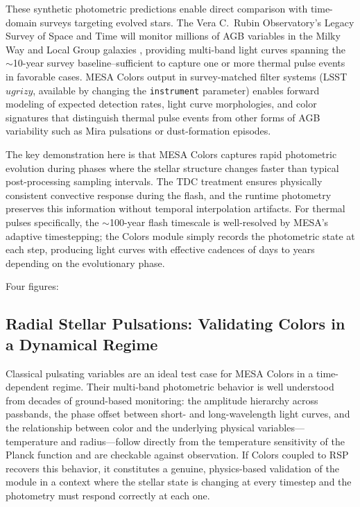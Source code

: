 \documentclass[linenumbers,apj,twocolumn, floatfix]{aastex701} \usepackage{amsmath} \usepackage{longtable} \usepackage{graphicx} \usepackage{ulem} \usepackage{xcolor} \usepackage{lettrine} \usepackage{yfonts} \usepackage{rotating}
\begin{document}
These synthetic photometric predictions enable direct comparison with time-domain surveys targeting evolved stars.
The Vera C.\ Rubin Observatory's Legacy Survey of Space and Time will monitor millions of AGB variables in the Milky Way and Local Group galaxies \citep{LSST}, providing multi-band light curves spanning the $\sim$10-year survey baseline--sufficient to capture one or more thermal pulse events in favorable cases.
MESA Colors output in survey-matched filter systems (LSST $ugrizy$, available by changing the \texttt{instrument} parameter) enables forward modeling of expected detection rates, light curve morphologies, and color signatures that distinguish thermal pulse events from other forms of AGB variability such as Mira pulsations or dust-formation episodes.

The key demonstration here is that MESA Colors captures rapid photometric evolution during phases where the stellar structure changes faster than typical post-processing sampling intervals.
The TDC treatment ensures physically consistent convective response during the flash, and the runtime photometry preserves this information without temporal interpolation artifacts.
For thermal pulses specifically, the $\sim$100-year flash timescale is well-resolved by MESA's adaptive timestepping; the Colors module simply records the photometric state at each step, producing light curves with effective cadences of days to years depending on the evolutionary phase.

Four figures: %

\subsection{Radial Stellar Pulsations: Validating Colors in a Dynamical Regime}
\label{sec:demo_rsp}

Classical pulsating variables are an ideal test case for MESA Colors in a time-dependent regime.
Their multi-band photometric behavior is well understood from decades of ground-based monitoring: the amplitude hierarchy across passbands, the phase offset between short- and long-wavelength light curves, and the relationship between color and the underlying physical variables—temperature and radius—follow directly from the temperature sensitivity of the Planck function and are checkable against observation.
If Colors coupled to RSP recovers this behavior, it constitutes a genuine, physics-based validation of the module in a context where the stellar state is changing at every timestep and the photometry must respond correctly at each one.
\end{document}

